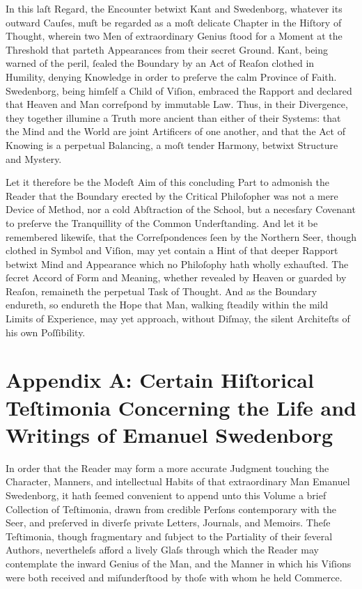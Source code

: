 \documentclass[12pt]{book}
\begin{document}
\vspace{1em}

\noindent
In this laſt Regard, the Encounter betwixt Kant and Swedenborg, whatever its outward Cauſes, muſt be regarded as a moſt delicate Chapter in the Hiſtory of Thought, wherein two Men of extraordinary Genius ſtood for a Moment at the Threshold that parteth Appearances from their secret Ground. Kant, being warned of the peril, ſealed the Boundary by an Act of Reaſon clothed in Humility, denying Knowledge in order to preſerve the calm Province of Faith. Swedenborg, being himſelf a Child of Viſion, embraced the Rapport and declared that Heaven and Man correſpond by immutable Law. Thus, in their Divergence, they together illumine a Truth more ancient than either of their Systems: that the Mind and the World are joint Artificers of one another, and that the Act of Knowing is a perpetual Balancing, a moſt tender Harmony, betwixt Structure and Mystery.

\vspace{1em}

\noindent
Let it therefore be the Modeſt Aim of this concluding Part to admonish the Reader that the Boundary erected by the Critical Philoſopher was not a mere Device of Method, nor a cold Abſtraction of the School, but a necesſary Covenant to preſerve the Tranquillity of the Common Underſtanding. And let it be remembered likewiſe, that the Correſpondences ſeen by the Northern Seer, though clothed in Symbol and Viſion, may yet contain a Hint of that deeper Rapport betwixt Mind and Appearance which no Philoſophy hath wholly exhauſted. The ſecret Accord of Form and Meaning, whether revealed by Heaven or guarded by Reaſon, remaineth the perpetual Task of Thought. And as the Boundary endureth, so endureth the Hope that Man, walking ſteadily within the mild Limits of Experience, may yet approach, without Diſmay, the silent Architeſts of his own Poſſibility.

\newpage
\appendix 

\section*{Appendix A: Certain Hiſtorical Teſtimonia Concerning the Life and Writings of Emanuel Swedenborg}


\noindent
In order that the Reader may form a more accurate Judgment touching the Character, Manners, and intellectual Habits of that extraordinary Man Emanuel Swedenborg, it hath ſeemed convenient to append unto this Volume a brief Collection of Teſtimonia, drawn from credible Perſons contemporary with the Seer, and preſerved in diverſe private Letters, Journals, and Memoirs. Theſe Teſtimonia, though fragmentary and ſubject to the Partiality of their ſeveral Authors, nevertheleſs afford a lively Glaſs through which the Reader may contemplate the inward Genius of the Man, and the Manner in which his Viſions were both received and miſunderſtood by thoſe with whom he held Commerce.
\end{document}
